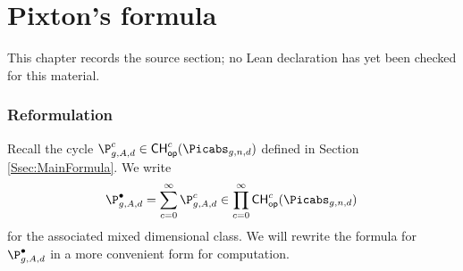 \chapter{Pixton's formula}
\label{pixtons-formula-abel-jacobi-picard-stack-chapter-05}

\begin{remark}
\label{pixtons-formula-abel-jacobi-picard-stack-chapter-05-source}
This chapter records the source section; no Lean declaration has yet been checked for this material.
\notready
\end{remark}

\label{sec:univeral_pixton}
\subsection{Reformulation}


Recall the cycle $\P_{g,A,d}^{c} \in \mathsf{CH}^c_{\mathsf{op}}(\Picabs_{g,n,d})$
defined in Section \ref{Ssec:MainFormula}. We write
$$\P_{g,A,d}^{\bullet} =\sum_{c=0}^\infty \P_{g,A,d}^{c}
\in \prod_{c=0}^\infty \mathsf{CH}^c_{\mathsf{op}}(\Picabs_{g,n,d})\, $$
for the associated mixed dimensional class.
We will rewrite the formula for $\P_{g,A,d}^{\bullet}$ in a
more convenient form for computation.

